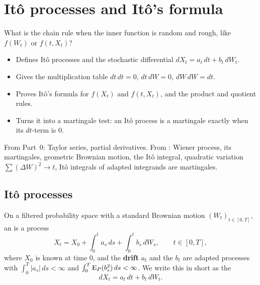 \chapter{Itô processes and Itô's formula}
\label{ch:ito-formula}

\begin{question}
What is the chain rule when the inner function is random and rough, like $f(W_t)$ or $f(t,X_t)$?
\end{question}

\begin{whatfor}
\begin{itemize}
  \item Defines Itô processes and the stochastic differential $dX_t=a_t\,dt+b_t\,dW_t$.
  \item Gives the multiplication table $dt\,dt=0$, $dt\,dW=0$, $dW\,dW=dt$.
  \item Proves Itô's formula for $f(X_t)$ and $f(t,X_t)$, and the product and quotient rules.
  \item Turns it into a martingale test: an Itô process is a martingale exactly when its $dt$-term is $0$.
\end{itemize}
\end{whatfor}

\begin{prereq}
From Part~0: Taylor series, partial derivatives. From : Wiener process, its martingales, geometric Brownian motion, the Itô integral, quadratic variation $\sum(\Delta W)^2\to t$, Itô integrals of adapted integrands are martingales.
\end{prereq}

\section{Itô processes}

\begin{definition}
\label{def:ito-process}
On a filtered probability space with a standard Brownian motion $(W_t)_{t\in[0,T]}$, an  is a process
\[
  X_t=X_0+\int_0^ta_s\,ds+\int_0^tb_s\,dW_s,\qquad t\in[0,T],
\]
where $X_0$ is known at time $0$, and the \textbf{drift} $a_t$ and the  $b_t$ are adapted processes with $\int_0^T|a_s|\,ds<\infty$ and $\int_0^T\operatorname{E}_P(b_s^2)\,ds<\infty$. We write this in short as the 
\[
  dX_t=a_t\,dt+b_t\,dW_t .
\]
\end{definition}

